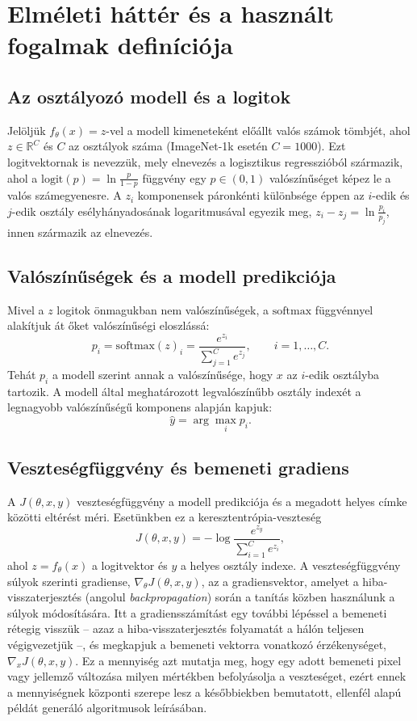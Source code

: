\section{Elméleti háttér és a használt fogalmak definíciója}

\subsection{Az osztályozó modell és a logitok}

Jelöljük $f_\theta(x) = z$-vel a modell kimeneteként előállt valós számok tömbjét, ahol $z \in \mathbb{R}^C$ és $C$ az osztályok 
száma (ImageNet-1k esetén $C=1000$). 
Ezt logitvektornak is nevezzük, mely elnevezés a logisztikus regresszióból származik, ahol a $\mathrm{logit}(p) = 
\ln\frac{p}{1-p}$ függvény egy $p \in (0, 1)$ valószínűséget képez le a valós számegyenesre. 
A $z_i$ komponensek páronkénti különbsége éppen az $i$-edik és $j$-edik osztály esélyhányadosának logaritmusával egyezik meg, 
$z_i - z_j = \ln\frac{p_i}{p_j}$, innen származik az elnevezés. 

\subsection{Valószínűségek és a modell predikciója}

Mivel a $z$ logitok önmagukban nem valószínűségek, a $\mathrm{softmax}$ függvénnyel alakítjuk át őket valószínűségi eloszlássá: 
\[
  p_i = \mathrm{softmax}(z)_i = \frac{e^{z_i}}{\sum_{j=1}^{C} e^{z_j}}, \qquad i = 1, \ldots, C.
\]
Tehát $p_i$ a modell szerint annak a valószínűsége, hogy $x$ az $i$-edik osztályba tartozik. 
A modell által meghatározott legvalószínűbb osztály indexét a legnagyobb valószínűségű komponens alapján kapjuk: 
\[
  \hat{y} = \arg\max_{i} p_i.
\]

\subsection{Veszteségfüggvény és bemeneti gradiens}

A $J(\theta, x, y)$ veszteségfüggvény a modell predikciója és a megadott helyes címke közötti eltérést méri. 
Esetünkben ez a keresztentrópia-veszteség 
\[
J(\theta, x, y) = -\log \frac{e^{z_y}}{\sum_{i=1}^{C} e^{z_i}},
\]
ahol $z = f_\theta(x)$ a logitvektor és $y$ a helyes osztály indexe. 
A veszteségfüggvény súlyok szerinti gradiense, $\nabla_\theta J(\theta, x, y)$, az a gradiensvektor, amelyet a 
hiba-visszaterjesztés (angolul \textit{backpropagation}) során a tanítás közben használunk a súlyok módosítására. 
Itt a gradiensszámítást egy további lépéssel a bemeneti rétegig visszük -- azaz a hiba-visszaterjesztés folyamatát a hálón 
teljesen végigvezetjük --, és megkapjuk a bemeneti vektorra vonatkozó érzékenységet, $\nabla_x J(\theta, x, y)$. 
Ez a mennyiség azt mutatja meg, hogy egy adott bemeneti pixel vagy jellemző változása milyen mértékben befolyásolja a 
veszteséget, ezért ennek a mennyiségnek központi szerepe lesz a későbbiekben bemutatott, ellenfél alapú példát generáló 
algoritmusok leírásában. 

